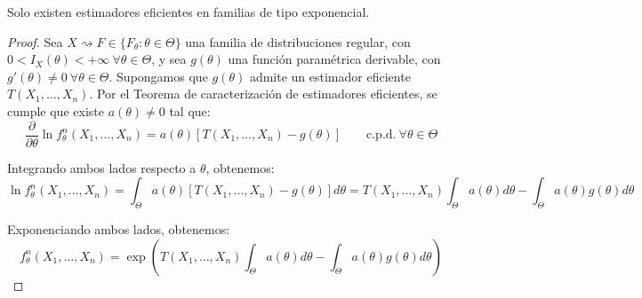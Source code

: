 \begin{coro}
    Solo existen estimadores eficientes en familias de tipo exponencial.
    \begin{proof}
        Sea $X \rightsquigarrow F \in \{F_\theta : \theta \in \Theta\}$ una familia de distribuciones regular, con $0 < I_X(\theta) < +\infty\ \forall \theta \in \Theta$, y sea $g(\theta)$ una función paramétrica derivable, con $g'(\theta) \neq 0\ \forall \theta \in \Theta$. Supongamos que $g(\theta)$ admite un estimador eficiente $T(X_1, \ldots, X_n)$. Por el Teorema de caracterización de estimadores eficientes, se cumple que existe $a(\theta) \neq 0$ tal que:
        \begin{equation*}
            \dfrac{\partial}{\partial\theta}\ln f^n_\theta(X_1,\ldots,X_n)=a(\theta)[T(X_1,\ldots,X_n)-g(\theta)]\qquad \text{c.p.d.} \ \forall \theta \in \Theta
        \end{equation*}

        Integrando ambos lados respecto a $\theta$, obtenemos:
        \begin{equation*}
            \ln f^n_\theta(X_1,\ldots,X_n) = \int_{\Theta} a(\theta)[T(X_1,\ldots,X_n)-g(\theta)] d\theta = T(X_1,\ldots,X_n) \int_{\Theta} a(\theta) d\theta - \int_{\Theta} a(\theta) g(\theta) d\theta
        \end{equation*}

        Exponenciando ambos lados, obtenemos:
        \begin{equation*}
            f^n_\theta(X_1,\ldots,X_n) = \exp\left(T(X_1,\ldots,X_n) \int_{\Theta} a(\theta) d\theta - \int_{\Theta} a(\theta) g(\theta) d\theta\right)
        \end{equation*}
    \end{proof}
\end{coro}

